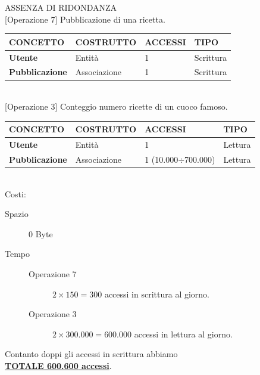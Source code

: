 \documentclass[12pt]{extarticle}
\begin{document}
\begin{center}
    \large{ASSENZA DI RIDONDANZA}\\
    \vspace{0.5cm}
    \normalsize{[Operazione 7] Pubblicazione di una ricetta.}\\
    \vspace{0.5cm}
    \begin{tabularx}{\textwidth}{X|X|X|X}
        \bfseries CONCETTO    & \bfseries COSTRUTTO     & \bfseries ACCESSI & \bfseries TIPO\\ 
        \hline\hline
        \bfseries Utente            & Entità                    & 1       &   Scrittura       \\ 
        \hline
        \bfseries Pubblicazione     & Associazione              & 1       &   Scrittura       \\
        \hline
    \end{tabularx}
    \\
    \vspace{1cm}
    \normalsize{[Operazione 3] Conteggio numero ricette di un cuoco famoso.}\\
    \vspace{0.5cm}
    \begin{tabularx}{\textwidth}{X|X|X|X}
        \bfseries CONCETTO    & \bfseries COSTRUTTO     & \bfseries ACCESSI & \bfseries TIPO\\ 
        \hline\hline
        \bfseries Utente            & Entità            & 1       &   Lettura    \\ 
        \hline
        \bfseries Pubblicazione            & Associazione         & 1  (10.000$\div$700.000)     &   Lettura    \\ 
        \hline
    \end{tabularx}
        \\
        \vspace{0.5cm} 
        Costi:
\end{center}


\begin{description}
    \item[Spazio] 0 Byte
    \item[Tempo] \hfill
    \begin{description}
        \item [Operazione 7] $2 \times 150=300$ accessi in scrittura al giorno.
        \item [Operazione 3] $2 \times 300.000=600.000$ accessi in lettura al giorno. 
    \end{description}  
\end{description}
\begin{center}
Contanto doppi gli accessi in scrittura abbiamo\\\uline{\bfseries{TOTALE 600.600} accessi}.
\end{center}
\end{document}
